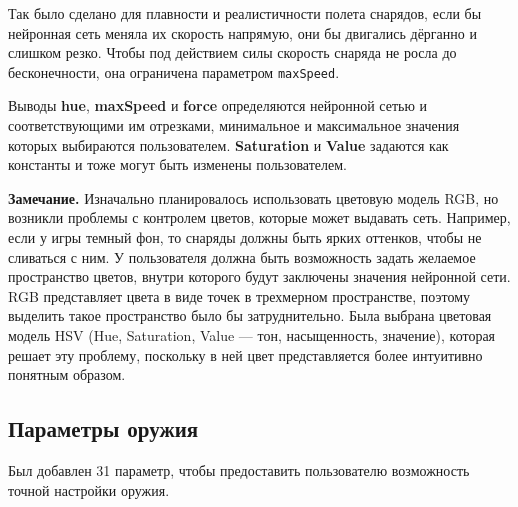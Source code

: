 Так было сделано для плавности и реалистичности полета снарядов, если бы нейронная сеть меняла их скорость напрямую, они бы двигались дёрганно и слишком резко. Чтобы под действием силы скорость снаряда не росла до бесконечности, она ограничена параметром \lstinline{maxSpeed}.

Выводы {\small \textbf{hue}}, {\small \textbf{maxSpeed}} и {\small \textbf{force}} определяются нейронной сетью и соответствующими им отрезками, минимальное и максимальное значения которых выбираются пользователем. {\small \textbf{Saturation}} и {\small \textbf{Value}} задаются как константы и тоже могут быть изменены пользователем.

\textbf{Замечание.} Изначально планировалось использовать цветовую модель RGB, но возникли проблемы с контролем цветов, которые может выдавать сеть. Например, если у игры темный фон, то снаряды должны быть ярких оттенков, чтобы не сливаться с ним. У пользователя должна быть возможность задать желаемое пространство цветов, внутри которого будут заключены значения нейронной сети. RGB представляет цвета в виде точек в трехмерном пространстве, поэтому выделить такое пространство было бы затруднительно. Была выбрана цветовая модель HSV (Hue, Saturation, Value — тон, насыщенность, значение), которая решает эту проблему, поскольку в ней цвет представляется более интуитивно понятным образом.


\subsection{Параметры оружия}
Был добавлен 31 параметр, чтобы предоставить пользователю возможность точной настройки оружия.

\vspace{5mm}

